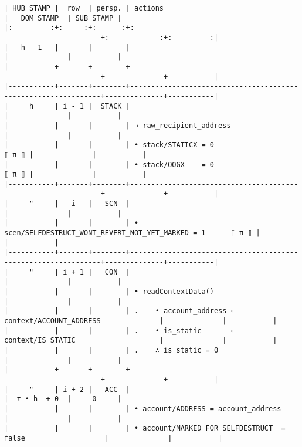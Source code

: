\documentclass[varwidth=\maxdimen,margin=0.5cm,multi={verbatim}]{standalone}
\begin{document}
\begin{verbatim}
| HUB_STAMP |  row  | persp. | actions                                                       |   DOM_STAMP  | SUB_STAMP |
|:---------:+:-----:+:------:+:--------------------------------------------------------------+:------------:+:---------:|
|   h - 1   |       |        |                                                               |              |           |
|-----------+-------+--------+---------------------------------------------------------------+--------------+-----------|
|-----------+-------+--------+---------------------------------------------------------------+--------------+-----------|
|     h     | i - 1 |  STACK |                                                               |              |           |
|           |       |        | → raw_recipient_address                                       |              |           |
|           |       |        | • stack/STATICX = 0                                     ⟦ π ⟧ |              |           |
|           |       |        | • stack/OOGX    = 0                                     ⟦ π ⟧ |              |           |
|-----------+-------+--------+---------------------------------------------------------------+--------------+-----------|
|     "     |   i   |   SCN  |                                                               |              |           |
|           |       |        | • scen/SELFDESTRUCT_WONT_REVERT_NOT_YET_MARKED = 1      ⟦ π ⟧ |              |           |
|-----------+-------+--------+---------------------------------------------------------------+--------------+-----------|
|     "     | i + 1 |   CON  |                                                               |              |           |
|           |       |        | • readContextData()                                           |              |           |
|           |       |        | .    • account_address ← context/ACCOUNT_ADDRESS              |              |           |
|           |       |        | .    • is_static       ← context/IS_STATIC                    |              |           |
|           |       |        | .    ∴ is_static = 0                                          |              |           |
|-----------+-------+--------+---------------------------------------------------------------+--------------+-----------|
|     "     | i + 2 |   ACC  |                                                               |  τ • h  + 0  |     0     |
|           |       |        | • account/ADDRESS = account_address                           |              |           |
|           |       |        | • account/MARKED_FOR_SELFDESTRUCT  =  false                   |              |           |

\end{verbatim}
\end{document}
